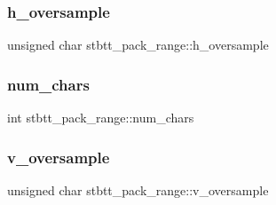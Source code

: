 \hypertarget{structstbtt__pack__range_a7a642139ce446c58fde5c48553bcf008}{}\label{structstbtt__pack__range_a7a642139ce446c58fde5c48553bcf008} 
\subsubsection{\texorpdfstring{h\+\_\+oversample}{h\_oversample}}
{\footnotesize\ttfamily unsigned char stbtt\+\_\+pack\+\_\+range\+::h\+\_\+oversample}

\hypertarget{structstbtt__pack__range_a046d65b6ffb65fb998d471ba098e2e23}{}\label{structstbtt__pack__range_a046d65b6ffb65fb998d471ba098e2e23} 
\subsubsection{\texorpdfstring{num\+\_\+chars}{num\_chars}}
{\footnotesize\ttfamily int stbtt\+\_\+pack\+\_\+range\+::num\+\_\+chars}

\hypertarget{structstbtt__pack__range_a6288f14006e257544db3d015c32b4113}{}\label{structstbtt__pack__range_a6288f14006e257544db3d015c32b4113} 
\subsubsection{\texorpdfstring{v\+\_\+oversample}{v\_oversample}}
{\footnotesize\ttfamily unsigned char stbtt\+\_\+pack\+\_\+range\+::v\+\_\+oversample}

